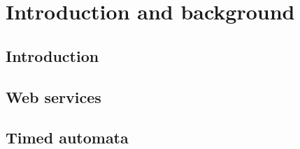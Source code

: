 
\part{Introduction and background}



\chapter{Introduction}
\label{chap:introduction}


\chapter{Web services}
\label{chap:web-services}


\chapter{Timed automata}
\label{chap:timed-automata}


